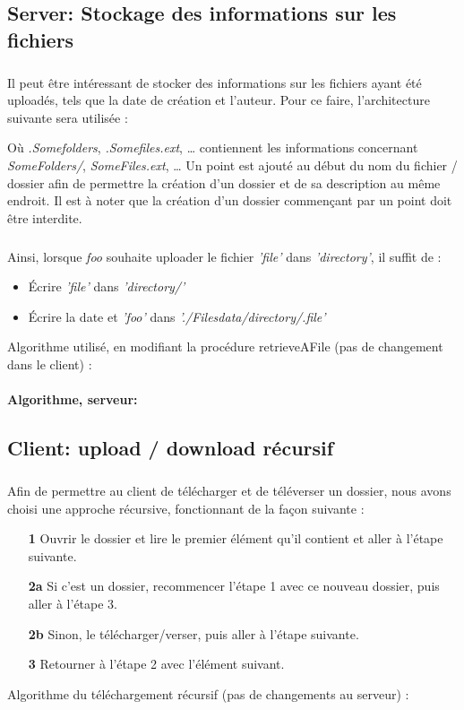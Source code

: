 \documentclass[12pt,a4paper,twoside]{article}
\begin{document}
		\subsection{Server: Stockage des informations sur les fichiers} %
			\subparagraph*{}
				Il peut être intéressant de stocker des informations sur les fichiers ayant été uploadés, tels que la date de création et l'auteur.
				Pour ce faire, l'architecture suivante sera utilisée :
				\begin{samepage}
					
				\end{samepage}
				Où \textit{.Somefolders}, \textit{.Somefiles.ext}, \ldots{} contiennent les informations concernant \textit{SomeFolders/}, \textit{SomeFiles.ext}, \ldots{}
				Un point est ajouté au début du nom du fichier / dossier afin de permettre la création d'un dossier et de sa description au même endroit. Il est à noter que la création d'un dossier commençant par un point doit être interdite.
			\subparagraph*{}
				Ainsi, lorsque \textit{foo} souhaite uploader le fichier \textit{'file'} dans \textit{'directory'}, il suffit de :
				\begin{itemize}
					\item{} Écrire \textit{'file'} dans \textit{'directory/'}
					\item{} Écrire la date et \textit{'foo'} dans \textit{'./Filesdata/directory/.file'}
				\end{itemize}
				Algorithme utilisé, en modifiant la procédure retrieveAFile (pas de changement dans le client) :
			\paragraph*{Algorithme, serveur:}
				
				
		\subsection{Client: upload / download récursif} %
			\subparagraph*{}
				Afin de permettre au client de télécharger et de téléverser un dossier, nous avons choisi une approche récursive, fonctionnant de la façon suivante :
				\begin{itemize}
					\item[\textbf{1 }]{} Ouvrir le dossier et lire le premier élément qu'il contient et aller à l'étape suivante.
					\item[\textbf{2a}]{} Si c'est un dossier, recommencer l'étape 1 avec ce nouveau dossier, puis aller à l'étape 3.
					\item[\textbf{2b}]{} Sinon, le télécharger/verser, puis aller à l'étape suivante.
					\item[\textbf{3 }]{} Retourner à l'étape 2 avec l'élément suivant.
				\end{itemize}
				Algorithme du téléchargement récursif (pas de changements au serveur) :
\end{document}
